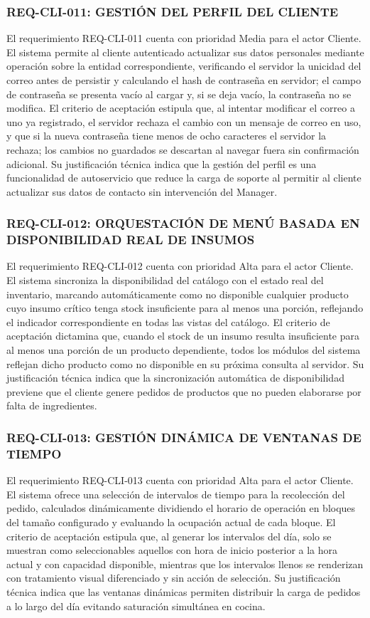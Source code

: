 \subsubsection{REQ-CLI-011: GESTIÓN DEL PERFIL DEL CLIENTE}
El requerimiento REQ-CLI-011 cuenta con prioridad Media para el actor Cliente. El sistema permite al cliente autenticado actualizar sus datos personales mediante operación sobre la entidad correspondiente, verificando el servidor la unicidad del correo antes de persistir y calculando el hash de contraseña en servidor; el campo de contraseña se presenta vacío al cargar y, si se deja vacío, la contraseña no se modifica. El criterio de aceptación estipula que, al intentar modificar el correo a uno ya registrado, el servidor rechaza el cambio con un mensaje de correo en uso, y que si la nueva contraseña tiene menos de ocho caracteres el servidor la rechaza; los cambios no guardados se descartan al navegar fuera sin confirmación adicional. Su justificación técnica indica que la gestión del perfil es una funcionalidad de autoservicio que reduce la carga de soporte al permitir al cliente actualizar sus datos de contacto sin intervención del Manager.

\subsubsection{REQ-CLI-012: ORQUESTACIÓN DE MENÚ BASADA EN DISPONIBILIDAD REAL DE INSUMOS}
El requerimiento REQ-CLI-012 cuenta con prioridad Alta para el actor Cliente. El sistema sincroniza la disponibilidad del catálogo con el estado real del inventario, marcando automáticamente como no disponible cualquier producto cuyo insumo crítico tenga stock insuficiente para al menos una porción, reflejando el indicador correspondiente en todas las vistas del catálogo. El criterio de aceptación dictamina que, cuando el stock de un insumo resulta insuficiente para al menos una porción de un producto dependiente, todos los módulos del sistema reflejan dicho producto como no disponible en su próxima consulta al servidor. Su justificación técnica indica que la sincronización automática de disponibilidad previene que el cliente genere pedidos de productos que no pueden elaborarse por falta de ingredientes.

\subsubsection{REQ-CLI-013: GESTIÓN DINÁMICA DE VENTANAS DE TIEMPO}
El requerimiento REQ-CLI-013 cuenta con prioridad Alta para el actor Cliente. El sistema ofrece una selección de intervalos de tiempo para la recolección del pedido, calculados dinámicamente dividiendo el horario de operación en bloques del tamaño configurado y evaluando la ocupación actual de cada bloque. El criterio de aceptación estipula que, al generar los intervalos del día, solo se muestran como seleccionables aquellos con hora de inicio posterior a la hora actual y con capacidad disponible, mientras que los intervalos llenos se renderizan con tratamiento visual diferenciado y sin acción de selección. Su justificación técnica indica que las ventanas dinámicas permiten distribuir la carga de pedidos a lo largo del día evitando saturación simultánea en cocina.

